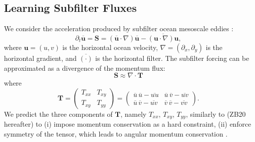 \documentclass[draft]{agujournal2019}
\begin{document}
\subsection{Learning Subfilter Fluxes}
We consider the acceleration produced by subfilter ocean mesoscale eddies \cite<subfilter forcing,>{Bolton2019}:
\begin{equation}
    \partial_t \overline{\mathbf{u}} = \mathbf{S} = (\overline{\mathbf{u}} \cdot \nabla ) \overline{\mathbf{u}} - \overline{(\mathbf{u} \cdot \nabla) \mathbf{u}},  \label{eq:subfilter_forcing}
\end{equation}
where $\mathbf{u}=(u,v)$ is the horizontal ocean  velocity, $\nabla=(\partial_x, \partial_y)$ is the horizontal gradient, and $\overline{(\cdot)}$ is the horizontal filter. The subfilter forcing can be approximated \cite{loose2023comparing} as a divergence of the momentum flux:
\begin{equation}
    \mathbf{S} \approx \nabla \cdot \mathbf{T} \label{eq:momentum_div}
\end{equation}
where
\begin{equation}
    \mathbf{T} = \begin{pmatrix}
        T_{xx} & T_{xy} \\
        T_{xy} & T_{yy}
    \end{pmatrix} = \begin{pmatrix}
        \overline{u}  \, \overline{u} - \overline{u u} & \overline{u} \, \overline{v} - \overline{uv} \\
        \overline{u} \, \overline{v} - \overline{uv} & 
        \overline{v}  \, \overline{v} - \overline{v v}
    \end{pmatrix}. \label{eq:momentum_flux}
\end{equation}
We predict the three components of $ \mathbf{T}$, namely   $T_{xx}$, $T_{xy}$, $T_{yy}$, similarly to  (ZB20 hereafter) to (i) impose momentum conservation as a hard constraint, (ii) enforce symmetry of the tensor, which leads to angular momentum conservation \cite[Section 17.3.3]{griffies2018fundamentals}.
\end{document}
